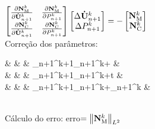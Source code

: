 \begin{algorithm}[h!]
{{            $\begin{bmatrix}
                    \frac{\partial{\mathbf{N}_\mathrm{M}^k}}{\partial{\mathbf{\dot{U}}_{n+1}^k}} & \frac{\partial{\mathbf{N}_\mathrm{M}^k}}{\partial{P_{n+1}^k}} \\
                    \frac{\partial{\mathbf{N}_\mathrm{C}^k}}{\partial{\mathbf{\dot{U}}_{n+1}^k}} & \frac{\partial{\mathbf{N}_\mathrm{C}^k}}{\partial{P_{n+1}^k}}
                \end{bmatrix}
                \begin{bmatrix}
                    \Delta\mathbf{\dot{U}}_{n+1}^k \\\Delta P_{n+1}^k
                \end{bmatrix}=-
                \begin{bmatrix}
                    \mathbf{N}_\mathrm{M}^k \\\mathbf{N}_\mathrm{C}^k
                \end{bmatrix}$\\
            Correção dos parâmetros:
            \begin{flalign*}
                 &   &  & _{n+1}^{k+1}\gets{}_{n+1}^k+\Delta{} & \\
                 &  &  & _{n+1}^{k+1}\gets{}_{n+1}^k+\gamma\Delta t\Delta{}     & \\
                 &     &  & _{n+1}^{k+1}\gets{}_{n+1}^k+\Delta{}_{n+1}^k                   &
            \end{flalign*}\\
            Cálculo do erro: erro$=\left\lVert{\mathbf{N}_\mathrm{M}^k}\right\lVert_{L^2}$
        }
    }
\end{algorithm}